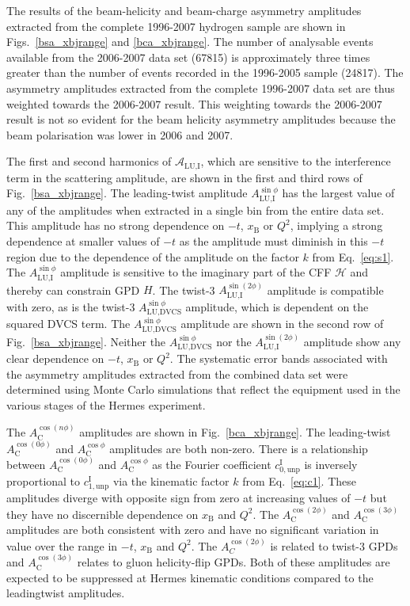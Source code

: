 The results of the beam-helicity and beam-charge asymmetry amplitudes extracted from the complete 1996-2007 hydrogen sample are shown in Figs.~\ref{bsa_xbjrange} and \ref{bca_xbjrange}. The number of analysable events available from the 2006-2007 data set (67815) is approximately three times greater than the number of events recorded in the 1996-2005 sample (24817). The  asymmetry amplitudes extracted from the complete 1996-2007 data set are thus weighted towards the 2006-2007 result. This weighting towards the 2006-2007 result is not so evident for the beam helicity asymmetry amplitudes because the beam polarisation was lower in 2006 and 2007.

The first and second harmonics of $\mathcal{A}_{\textrm{LU,I}}$, which are
sensitive to the interference term in the scattering amplitude, are shown in the first and third rows of Fig.~\ref{bsa_xbjrange}. The leading-twist amplitude $A_{\textrm{LU,I}}^{\sin\phi}$ has the largest value of any of the amplitudes when extracted in a single bin from the entire data set. This amplitude has no strong dependence on $-t$, $x_{\textrm{B}}$ or $Q^{2}$, implying a strong dependence at smaller values of $-t$ as the amplitude must diminish in this $-t$ region due to the dependence of the amplitude on the factor $k$ from Eq.~\ref{eq:s1}. The $A_{\textrm{LU,I}}^{\sin\phi}$ amplitude is sensitive to the imaginary part of the CFF $\mathcal{H}$ and thereby can constrain GPD $\textit{H}$. The twist-3 $A_{\textrm{LU,I}}^{\sin(2\phi)}$ amplitude is compatible with zero, as is the twist-3 $A_{\textrm{LU,DVCS}}^{\sin\phi}$ amplitude, which is dependent on the squared DVCS term. The $A_{\textrm{LU,DVCS}}^{\sin\phi}$ amplitude are shown in the second row of Fig.~\ref{bsa_xbjrange}. Neither the $A_{\textrm{LU,DVCS}}^{\sin\phi}$ nor the $A_{\textrm{LU,I}}^{\sin(2\phi)}$ amplitude show any clear dependence on $-t$, $x_{\textrm{B}}$ or $Q^{2}$. The systematic error bands associated with the asymmetry amplitudes extracted from the combined data set were determined using Monte Carlo simulations that reflect the equipment used in the various stages of the H{\sc ermes} experiment. 

The $A_{\textrm{C}}^{\cos(n\phi)}$ amplitudes are shown in Fig.~\ref{bca_xbjrange}. The leading-twist $A_{\textrm{C}}^{\cos(0\phi)}$ and $A_{\textrm{C}}^{\cos\phi}$ amplitudes are both non-zero. There is a relationship between $A_{\textrm{C}}^{\cos(0\phi)}$ and $A_{\textrm{C}}^{\cos\phi}$ as the Fourier coefficient $c^{\textrm{I}}_{0,\textrm{unp}}$ is inversely proportional to $c^{\textrm{I}}_{1,\textrm{unp}}$ via the kinematic factor $k$ from Eq.~\ref{eq:c1}. These amplitudes diverge with opposite sign from zero at increasing values of $-t$ but they
have no discernible dependence on $x_{\textrm{B}}$ and $Q^{2}$. The $A_{\textrm{C}}^{\cos(2\phi)}$ and $A_{\textrm{C}}^{\cos(3\phi)}$ amplitudes are both consistent with zero and have no significant variation in value over the range in $-t$, $x_{\textrm{B}}$ and $Q^{2}$. The $A_{C}^{\cos(2\phi)}$  is related to twist-3 GPDs and $A_{\textrm{C}}^{\cos(3\phi)}$ relates to gluon helicity-flip GPDs. Both of these amplitudes are expected to be suppressed at H{\sc ermes} kinematic conditions compared to the leading\blue{-}twist amplitudes.

